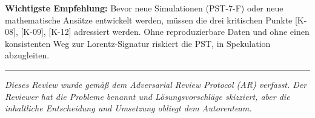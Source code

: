 \documentclass[11pt,a4paper]{article}
\begin{document}
\vspace{1em}

\noindent\textbf{Wichtigste Empfehlung:} Bevor neue Simulationen
(PST-7-F) oder neue mathematische Ans\"{a}tze entwickelt werden,
m\"{u}ssen die drei kritischen Punkte [K-08], [K-09], [K-12]
adressiert werden. Ohne reproduzierbare Daten und ohne einen
konsistenten Weg zur Lorentz-Signatur riskiert die PST, in
Spekulation abzugleiten.

\vspace{2em}

\begin{center}
\rule{0.5\textwidth}{0.4pt}
\end{center}

\vspace{1em}

\noindent\textit{Dieses Review wurde gem\"{a}\ss{} dem Adversarial Review
Protocol (AR) verfasst. Der Reviewer hat die Probleme benannt und
L\"{o}sungsvorschl\"{a}ge skizziert, aber die inhaltliche Entscheidung
und Umsetzung obliegt dem Autorenteam.}
\end{document}
